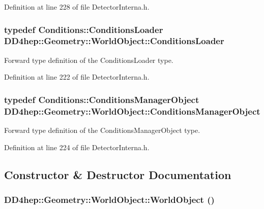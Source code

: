 Definition at line 228 of file DetectorInterna.h.\hypertarget{class_d_d4hep_1_1_geometry_1_1_world_object_ab3186f89db27a386504504645203d688}{
\subsubsection[{ConditionsLoader}]{\setlength{\rightskip}{0pt plus 5cm}typedef {\bf Conditions::ConditionsLoader} {\bf DD4hep::Geometry::WorldObject::ConditionsLoader}}}
\label{class_d_d4hep_1_1_geometry_1_1_world_object_ab3186f89db27a386504504645203d688}


Forward type definition of the ConditionsLoader type. 

Definition at line 222 of file DetectorInterna.h.\hypertarget{class_d_d4hep_1_1_geometry_1_1_world_object_a96576e6e392fe72924c1135cc8907aec}{
\subsubsection[{ConditionsManagerObject}]{\setlength{\rightskip}{0pt plus 5cm}typedef {\bf Conditions::ConditionsManagerObject} {\bf DD4hep::Geometry::WorldObject::ConditionsManagerObject}}}
\label{class_d_d4hep_1_1_geometry_1_1_world_object_a96576e6e392fe72924c1135cc8907aec}


Forward type definition of the ConditionsManagerObject type. 

Definition at line 224 of file DetectorInterna.h.

\subsection{Constructor \& Destructor Documentation}
\hypertarget{class_d_d4hep_1_1_geometry_1_1_world_object_a69331daf3614dc0e3a5f7ff37164c8ef}{
\subsubsection[{WorldObject}]{\setlength{\rightskip}{0pt plus 5cm}DD4hep::Geometry::WorldObject::WorldObject ()}}
\label{class_d_d4hep_1_1_geometry_1_1_world_object_a69331daf3614dc0e3a5f7ff37164c8ef}


